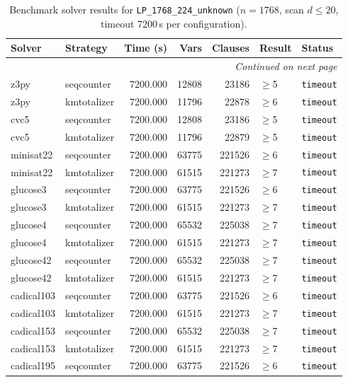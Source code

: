 \begin{longtable}{llrrrl p{}}
\caption{Benchmark solver results for \texttt{LP\_1768\_224\_unknown} ($n=1768$, scan $d \leq 20$, timeout 7200\,s per configuration).} \label{tab:bench-LP_1768_224_unknown} \\
\toprule
Solver & Strategy & Time (s) & Vars & Clauses & Result & Status \\
\midrule
\endhead
\midrule
\multicolumn{7}{r}{\textit{Continued on next page}} \\
\midrule
\endfoot
\bottomrule
\endlastfoot
z3py & seqcounter & 7200.000 & 12808 & 23186 & $\geq$5 & \texttt{timeout} \\
z3py & kmtotalizer & 7200.000 & 11796 & 22878 & $\geq$6 & \texttt{timeout} \\
cvc5 & seqcounter & 7200.000 & 12808 & 23186 & $\geq$5 & \texttt{timeout} \\
cvc5 & kmtotalizer & 7200.000 & 11796 & 22879 & $\geq$5 & \texttt{timeout} \\
minisat22 & seqcounter & 7200.000 & 63775 & 221526 & $\geq$6 & \texttt{timeout} \\
minisat22 & kmtotalizer & 7200.000 & 61515 & 221273 & $\geq$7 & \texttt{timeout} \\
glucose3 & seqcounter & 7200.000 & 63775 & 221526 & $\geq$6 & \texttt{timeout} \\
glucose3 & kmtotalizer & 7200.000 & 61515 & 221273 & $\geq$7 & \texttt{timeout} \\
glucose4 & seqcounter & 7200.000 & 65532 & 225038 & $\geq$7 & \texttt{timeout} \\
glucose4 & kmtotalizer & 7200.000 & 61515 & 221273 & $\geq$7 & \texttt{timeout} \\
glucose42 & seqcounter & 7200.000 & 65532 & 225038 & $\geq$7 & \texttt{timeout} \\
glucose42 & kmtotalizer & 7200.000 & 61515 & 221273 & $\geq$7 & \texttt{timeout} \\
cadical103 & seqcounter & 7200.000 & 63775 & 221526 & $\geq$6 & \texttt{timeout} \\
cadical103 & kmtotalizer & 7200.000 & 61515 & 221273 & $\geq$7 & \texttt{timeout} \\
cadical153 & seqcounter & 7200.000 & 65532 & 225038 & $\geq$7 & \texttt{timeout} \\
cadical153 & kmtotalizer & 7200.000 & 61515 & 221273 & $\geq$7 & \texttt{timeout} \\
cadical195 & seqcounter & 7200.000 & 63775 & 221526 & $\geq$6 & \texttt{timeout} \\

\end{longtable}
